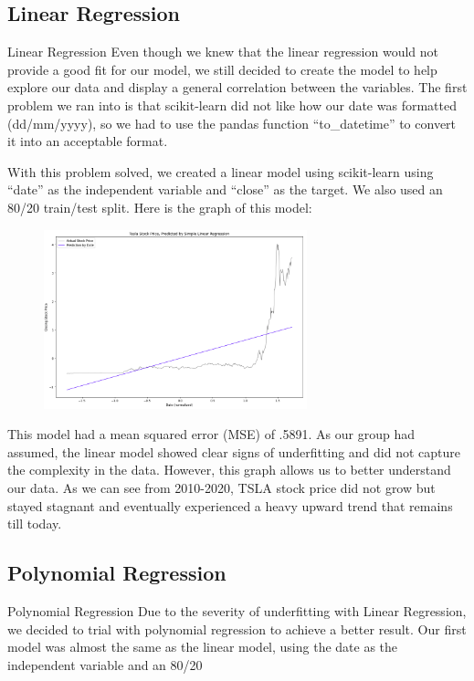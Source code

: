 \documentclass[12pt,a4paper]{article}
\begin{document}
\subsection{Linear Regression}
Linear Regression
Even though we knew that the linear regression would not provide a good fit for our model, we still decided to create the model to help explore our data and display a general correlation between the variables. The first problem we ran into is that scikit-learn did not like how our date was formatted (dd/mm/yyyy), so we had to use the pandas function “to_datetime” to convert it into an acceptable format. 

With this problem solved, we created a linear model using scikit-learn using “date” as the independent variable and “close” as the target. We also used an 80/20 train/test split. Here is the graph of this model:

\begin{figure}[h]
\centering
\includegraphics[width=3in]{./Figures/LinearRegression.png}
\end{figure}

This model had a mean squared error (MSE) of .5891. As our group had assumed, the linear model showed clear signs of underfitting and did not capture the complexity in the data. However, this graph allows us to better understand our data. As we can see from 2010-2020, TSLA stock price did not grow but stayed stagnant and eventually experienced a heavy upward trend that remains till today. 


\subsection{Polynomial Regression}
Polynomial Regression
Due to the severity of underfitting with Linear Regression, we decided to trial with polynomial regression to achieve a better result. Our first model was almost the same as the linear model, using the date as the independent variable and an 80/20%
\end{document}
